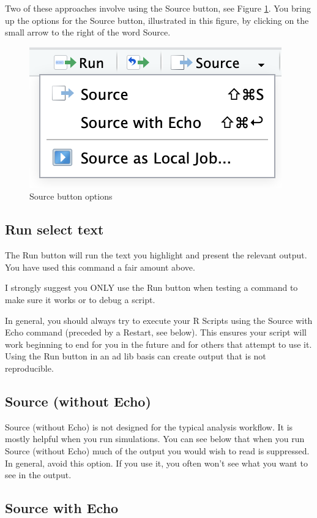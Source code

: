 \documentclass[
]{krantz}
\begin{document}
Two of these approaches involve using the Source button, see Figure \ref{fig:sourcebutton}. You bring up the options for the Source button, illustrated in this figure, by clicking on the small arrow to the right of the word Source.

\begin{figure}
\includegraphics[width=0.35\linewidth]{ch_first_time/images/screenshot_source} \caption{Source button options}\label{fig:sourcebutton}
\end{figure}

\hypertarget{run-select-text}{%
\subsection{Run select text}\label{run-select-text}}

The Run button will run the text you highlight and present the relevant output. You have used this command a fair amount above.

I strongly suggest you ONLY use the Run button when testing a command to make sure it works or to debug a script.

In general, you should always try to execute your R Scripts using the Source with Echo command (preceded by a Restart, see below). This ensures your script will work beginning to end for you in the future and for others that attempt to use it. Using the Run button in an ad lib basis can create output that is not reproducible.

\hypertarget{source-without-echo}{%
\subsection{Source (without Echo)}\label{source-without-echo}}

Source (without Echo) is not designed for the typical analysis workflow. It is mostly helpful when you run simulations. You can see below that when you run Source (without Echo) much of the output you would wish to read is suppressed. In general, avoid this option. If you use it, you often won't see what you want to see in the output.

\hypertarget{source-with-echo}{%
\subsection{Source with Echo}\label{source-with-echo}}
\end{document}
